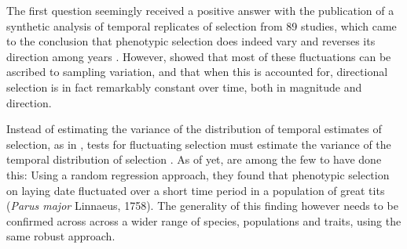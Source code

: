 The first question seemingly received a positive answer with the publication of a synthetic analysis of temporal replicates of selection from 89 studies, which came to the conclusion that phenotypic selection does indeed vary and reverses its direction among years \parencite{Siepielski2009}. However, \cite{Morrissey2012flusel} showed that most of these fluctuations can be ascribed to sampling variation, and that when this is accounted for, directional selection is in fact remarkably constant over time, both in magnitude and direction. 

Instead of estimating the variance of the distribution of temporal estimates of selection, as in \parencite{Siepielski2009}, tests for fluctuating selection must estimate the variance of the temporal distribution of selection \cite{Morrissey2012flusel}. As of yet, \cite{Chevin2015b} are among the few to have done this: Using a random regression approach, they found that phenotypic selection on laying date fluctuated over a short time period in a population of great tits (\textit{Parus major} Linnaeus, 1758). The generality of this finding however needs to be confirmed across across a wider range of species, populations and traits, using the same robust approach. 

